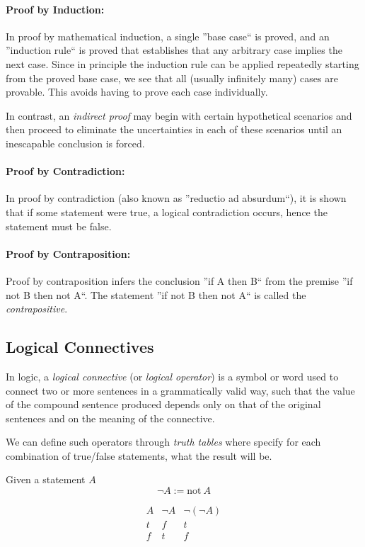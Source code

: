 \paragraph{Proof by Induction:} In proof by mathematical induction, a single ''base case`` is proved, and an ''induction rule`` is proved that establishes that any arbitrary case implies the next case.
Since in principle the induction rule can be applied repeatedly starting from the proved base case, we see that all (usually infinitely many) cases are provable.
This avoids having to prove each case individually.

In contrast, an \emph{indirect proof} may begin with certain hypothetical scenarios and then proceed to eliminate the uncertainties in each of these scenarios until an inescapable conclusion is forced.
\paragraph{Proof by Contradiction:} In proof by contradiction (also known as ''reductio ad absurdum``), it is shown that if some statement were true, a logical contradiction occurs, hence the statement must be false.
\paragraph{Proof by Contraposition:} Proof by contraposition infers the conclusion ''if A then B`` from the premise ''if not B then not A``.
The statement ''if not B then not A`` is called the \textit{contrapositive}.

\subsection{Logical Connectives}
In logic, a \emph{logical connective} (or \emph{logical operator}) is a symbol or word used to connect two or more sentences in a grammatically valid way, such that the value of the compound sentence produced depends only on that of the original sentences and on the meaning of the connective.

We can define such operators through \textit{truth tables} where specify for each combination of true/false statements, what the result will be.

\begin{definition}[Negation]
   Given a statement \(A\)
   \[\neg A := \text{not}~A\]

   \[\begin{array}{c||c|c}
         A & \neg A & \neg(\neg A)\\
         \hline
         t & f & t\\
         f & t & f
      \end{array}\]
\end{definition}

